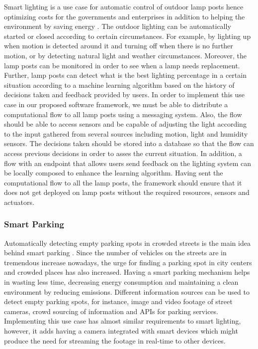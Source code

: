 Smart lighting is a use case for automatic control of outdoor lamp posts hence optimizing costs for the governments and enterprises in addition to helping the environment by saving energy \cite{6740844}. The outdoor lighting can be automatically started or closed according to certain circumstances. For example, by lighting up when motion is detected   around it and turning off when there is no further motion, or by detecting natural light  and weather circumstances. Moreover, the lamp posts can be monitored in order to see when a lamp needs replacement.  Further, lamp posts can detect what is the best lighting percentage in a certain situation according to a machine learning algorithm based on the history of decisions taken and feedback provided by users.  In order to implement this use case in our proposed software framework, we must be able to distribute a computational flow to all lamp posts using a messaging system.  Also, the flow should be able to access sensors and be capable of adjusting the light according to the input gathered from several sources including motion, light and humidity sensors.  The decisions taken  should  be   stored into a database so that the flow can access  previous decisions in order to asses the current situation. In addition, a flow with an endpoint that  allows users send feedback on the lighting system can be locally composed to enhance the learning algorithm. Having sent the computational flow to all the lamp posts, the framework should ensure that it does not get deployed on lamp posts without the  required resources, sensors and actuators. 

\subsubsection{Smart Parking}
Automatically detecting empty parking spots in crowded streets is the main idea behind smart parking \cite{4543911}. Since the number of vehicles on the streets are in tremendous increase nowadays, the urge for finding a parking spot in city centers and crowded places has also increased. Having a smart parking mechanism helps in wasting less time, decreasing energy consumption and maintaining a clean environment by reducing emissions.  Different information sources can be used to  detect empty parking spots, for instance, image and video footage of street cameras, crowd sourcing of information and APIs for parking services. Implementing this use case has almost similar requirements to smart lighting, however, it adds having  a camera integrated with smart devices which might produce the need for streaming the footage in real-time to other devices.


